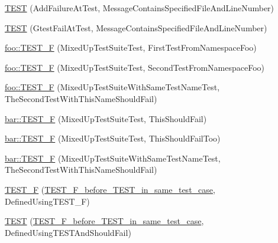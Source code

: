 \begin{DoxyCompactItemize}
\item 
\mbox{\hyperlink{_obj__test_2lib_2googletest-master_2googletest_2test_2googletest-output-test___8cc_a62631ea26f8f98f3f19dc03f950dc197}{T\+E\+ST}} (Add\+Failure\+At\+Test, Message\+Contains\+Specified\+File\+And\+Line\+Number)
\item 
\mbox{\hyperlink{_obj__test_2lib_2googletest-master_2googletest_2test_2googletest-output-test___8cc_a55ed27923966fd2997638340ff07caa1}{T\+E\+ST}} (Gtest\+Fail\+At\+Test, Message\+Contains\+Specified\+File\+And\+Line\+Number)
\item 
\mbox{\hyperlink{namespacefoo_a849b0cc834d25429f0391db7e0eb9dc1}{foo\+::\+T\+E\+S\+T\+\_\+F}} (Mixed\+Up\+Test\+Suite\+Test, First\+Test\+From\+Namespace\+Foo)
\item 
\mbox{\hyperlink{namespacefoo_a5e6f45cc38f6752f717235b183163550}{foo\+::\+T\+E\+S\+T\+\_\+F}} (Mixed\+Up\+Test\+Suite\+Test, Second\+Test\+From\+Namespace\+Foo)
\item 
\mbox{\hyperlink{namespacefoo_afced5d7fbc3e96e3309591e09fbae5c4}{foo\+::\+T\+E\+S\+T\+\_\+F}} (Mixed\+Up\+Test\+Suite\+With\+Same\+Test\+Name\+Test, The\+Second\+Test\+With\+This\+Name\+Should\+Fail)
\item 
\mbox{\hyperlink{namespacebar_a95397ed83e5072747d6333cbfae5ea0e}{bar\+::\+T\+E\+S\+T\+\_\+F}} (Mixed\+Up\+Test\+Suite\+Test, This\+Should\+Fail)
\item 
\mbox{\hyperlink{namespacebar_ae02a29b454cf88337a77336c2bf1f0a4}{bar\+::\+T\+E\+S\+T\+\_\+F}} (Mixed\+Up\+Test\+Suite\+Test, This\+Should\+Fail\+Too)
\item 
\mbox{\hyperlink{namespacebar_a23b15d10e91f920a5ed07ae9f27916df}{bar\+::\+T\+E\+S\+T\+\_\+F}} (Mixed\+Up\+Test\+Suite\+With\+Same\+Test\+Name\+Test, The\+Second\+Test\+With\+This\+Name\+Should\+Fail)
\item 
\mbox{\hyperlink{_obj__test_2lib_2googletest-master_2googletest_2test_2googletest-output-test___8cc_ae71a8d4934e768af615b9b09418f15c3}{T\+E\+S\+T\+\_\+F}} (\mbox{\hyperlink{class_t_e_s_t___f__before___t_e_s_t__in__same__test__case}{T\+E\+S\+T\+\_\+\+F\+\_\+before\+\_\+\+T\+E\+S\+T\+\_\+in\+\_\+same\+\_\+test\+\_\+case}}, Defined\+Using\+T\+E\+S\+T\+\_\+F)
\item 
\mbox{\hyperlink{_obj__test_2lib_2googletest-master_2googletest_2test_2googletest-output-test___8cc_a4b026b84b5a6dcbfa586f406e7c6b79c}{T\+E\+ST}} (\mbox{\hyperlink{class_t_e_s_t___f__before___t_e_s_t__in__same__test__case}{T\+E\+S\+T\+\_\+\+F\+\_\+before\+\_\+\+T\+E\+S\+T\+\_\+in\+\_\+same\+\_\+test\+\_\+case}}, Defined\+Using\+T\+E\+S\+T\+And\+Should\+Fail)

\end{DoxyCompactItemize}
